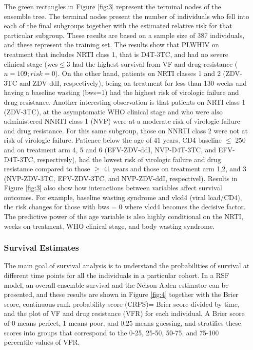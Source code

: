 \documentclass[10pt]{NSP1}
\begin{document}
The green rectangles in Figure \ref{fig:3} represent the terminal nodes of the ensemble tree. The terminal nodes present the number of individuals who fell into each of the final subgroups together with the estimated relative risk for that particular subgroup. These results are based on a sample size of 387 individuals, and these represent the training set. The results show that PLWHIV on treatment that includes NRTI class 1, that is D4T-3TC, and had no severe clinical stage (wcs$\leq 3$ had the highest survival from VF and drug resistance ($n=109; risk=0$). On the other hand, patients on NRTI classes 1 and 2 (ZDV-3TC and ZDV-ddI, respectively), being on treatment for less than 130 weeks and having a baseline wasting (bws=1) had the highest risk of virologic failure and drug resistance. Another interesting observation is that patients on NRTI class 1 (ZDV-3TC), at the asymptomatic WHO clinical stage and who were also administered NNRTI class 1 (NVP) were at a moderate risk of virologic failure and drug resistance. For this same subgroup, those on NNRTI class 2 were not at risk of virologic failure. Patience below the age of 41 years, CD4 baseline $\leq$ 250 and on treatment arm 4, 5 and 6 (EFV-ZDV-ddI, NVP-D4T-3TC, and EFV-D4T-3TC, respectively), had the lowest risk of virologic failure and drug resistance compared to those $\geq$ 41 years and those on treatment arm 1,2, and 3 (NVP-ZDV-3TC, EFV-ZDV-3TC, and NVP-ZDV-ddI, respectivel). Results in Figure \ref{fig:3} also show how interactions between variables affect survival outcomes. For example, baseline wasting syndrome and vlcd4 (viral load/CD4), the risk changes for those with bws = 0 where vlcd4 becomes the decisive factor. The predictive power of the age variable is also highly conditional on the NRTI, weeks on treatment, WHO clinical stage, and body wasting syndrome.


\subsubsection{Survival Estimates}
The main goal of survival analysis is to understand the probabilities of survival at different time points for all the individuals in a particular cohort. In a RSF model, an overall ensemble survival and the Nelson-Aalen estimator can be presented, and these results are shown in Figure \ref{fig:4} together with the Brier score, continuous-rank probability score (CRPS)= Brier score divided by time, and the plot of VF and drug resistance (VFR) for each individual. A Brier score of 0 means perfect, 1 means poor, and 0.25 means guessing, and stratifies these scores into groups that correspond to the 0-25, 25-50, 50-75, and 75-100 percentile values of VFR.
\end{document}

